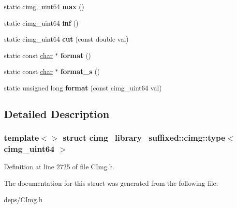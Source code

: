 \begin{DoxyCompactItemize}
static cimg\+\_\+uint64 {\bfseries max} ()
\item 
\mbox{\label{structcimg__library__suffixed_1_1cimg_1_1type_3_01cimg__uint64_01_4_a0a4ac834a08950452bf4a8339ef2e44f}} 
static cimg\+\_\+uint64 {\bfseries inf} ()
\item 
\mbox{\label{structcimg__library__suffixed_1_1cimg_1_1type_3_01cimg__uint64_01_4_a8ceda371208b96ed2a0902104334c5eb}} 
static cimg\+\_\+uint64 {\bfseries cut} (const double val)
\item 
\mbox{\label{structcimg__library__suffixed_1_1cimg_1_1type_3_01cimg__uint64_01_4_a83e83c1c13fab370a43ed40ff0023f70}} 
static const \hyperlink{classchar}{char} $\ast$ {\bfseries format} ()
\item 
\mbox{\label{structcimg__library__suffixed_1_1cimg_1_1type_3_01cimg__uint64_01_4_a391c996248ee9180d5ca1e8acd9a8189}} 
static const \hyperlink{classchar}{char} $\ast$ {\bfseries format\+\_\+s} ()
\item 
\mbox{\label{structcimg__library__suffixed_1_1cimg_1_1type_3_01cimg__uint64_01_4_afeaccb1407f311e57d3bb408734dac11}} 
static unsigned long {\bfseries format} (const cimg\+\_\+uint64 val)
\end{DoxyCompactItemize}


\subsection{Detailed Description}
\subsubsection*{template$<$$>$\newline
struct cimg\+\_\+library\+\_\+suffixed\+::cimg\+::type$<$ cimg\+\_\+uint64 $>$}



Definition at line 2725 of file C\+Img.\+h.



The documentation for this struct was generated from the following file\+:\begin{DoxyCompactItemize}
\item 
deps/C\+Img.\+h\end{DoxyCompactItemize}
